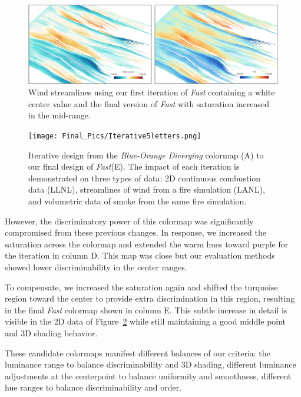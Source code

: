 \documentclass{IEEEcsmag}
\newcommand*{\fix}[1]{\textbf{\emph{\textcolor{red}{#1}}}}
\newcommand*{\colormap}[1]{\textsl{#1}\xspace}
\newcommand*{\blueorange}{\colormap{Blue-Orange Diverging}}
\newcommand*{\fast}{\colormap{Fast}}
\begin{document}
\begin{figure}[tb]
\includegraphics[width=\linewidth]{Final_Pics/white_yellow.png}
\caption{Wind streamlines using our first iteration of \fast containing a white center value and the final version of \fast with saturation increased in the mid-range.}
\label{fig:middle-point}
\end{figure}

\begin{figure}[htb]
  \centering
  \texttt{[image: Final\_Pics/Iterative5letters.png]}
  \caption{
    Iterative design from the \blueorange colormap (A) to our final design of \fast (E).
    The impact of each iteration is demonstrated on three types of data: 2D continuous combustion data (LLNL), streamlines of wind from a fire simulation (LANL), and volumetric data of smoke from the same fire simulation.
  }
\label{fig:iterations}
\end{figure}



However, the discriminatory power of this colormap was significantly compromised from these previous changes.
In response, we increased the saturation across the colormap and extended the warm hues toward purple for the iteration in column D.
This map was close but our evaluation methods showed lower discriminability in the center ranges. 


To compensate, we increased the saturation again and shifted the turquoise region toward the center to provide extra discrimination in this region, resulting in the final \fast colormap shown in column E.
This subtle increase in detail is visible in the 2D data of Figure~\ref{fig:iterations} while still maintaining a good middle point and 3D shading behavior.




These candidate colormaps manifest different balances of our criteria: the luminance range to balance discriminability and 3D shading, different luminance adjustments at the centerpoint to balance uniformity and smoothness, different hue ranges to balance discriminability and order. 
\end{document}
